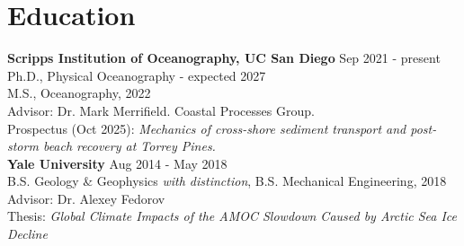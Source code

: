 \documentclass[a4paper,10pt]{article}
\begin{document}
\section{Education}
\textbf{Scripps Institution of Oceanography, UC San Diego} \hfill Sep 2021 - present\\[3.75pt]
Ph.D., Physical Oceanography - expected 2027\\[3.75pt]
M.S., Oceanography, 2022\\[3.75pt]
Advisor: Dr. Mark Merrifield. Coastal Processes Group.\\[3.75pt]
Prospectus (Oct 2025): \emph{Mechanics of cross-shore sediment transport and post-storm beach recovery at Torrey Pines.}\\[3.75pt]
\textbf{Yale University} \hfill Aug 2014 - May 2018\\[3.75pt]
B.S. Geology \& Geophysics \emph{with distinction}, B.S. Mechanical Engineering, 2018\\[3.75pt]
Advisor: Dr. Alexey Fedorov\\[3.75pt]
Thesis: \emph{Global Climate Impacts of the AMOC Slowdown Caused by Arctic Sea Ice Decline}


\end{document}
